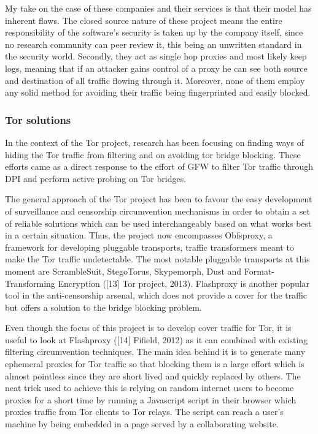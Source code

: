 \documentclass[11pt]{book} %
\begin{document}
My take on the case of these companies and their services is that their model has inherent flaws.  The closed source nature of these project means the entire responsibility of the software’s security is taken up by the company itself, since no research community can peer review it, this being an unwritten standard in the security world. Secondly, they act as single hop proxies and most likely keep logs, meaning that if an attacker gains control of a proxy he can see both source and destination of all traffic flowing through it. Moreover, none of them employ any solid method for avoiding their traffic being fingerprinted and easily blocked.

\subsubsection{Tor solutions}

In the context of the Tor project, research has been focusing on finding ways of hiding the Tor traffic from filtering and on avoiding tor bridge blocking. These efforts came as a direct response to the effort of GFW to filter Tor traffic through DPI and perform active probing on Tor bridges.

The general approach of the Tor project has been to favour the easy development of surveillance and censorship circumvention mechanisms in order to obtain a set of reliable solutions which can be used interchangeably based on what works best in a certain situation. Thus, the project now encompasses Obfsproxy, a framework for developing pluggable transports, traffic transformers meant to make the Tor traffic undetectable. The most notable pluggable transports at this moment are ScrambleSuit, StegoTorus, Skypemorph, Dust and Format-Transforming Encryption ([13] Tor project, 2013). Flashproxy is another popular tool in the anti-censorship arsenal, which does not provide a cover for the traffic but offers a solution to the bridge blocking problem.


Even though the focus of this project is to develop cover traffic for Tor, it is useful to look at Flashproxy ([14] Fifield, 2012) as it can combined with existing filtering circumvention techniques. The main idea behind it is to generate many ephemeral proxies for Tor traffic so that blocking them is a large effort which is almost pointless since they are short lived and quickly replaced by others. The neat trick used to achieve this is relying on random internet users to become proxies for a short time by running a Javascript script in their browser which proxies traffic from Tor clients to Tor relays. The script can reach a user’s machine by being embedded in a page served by a collaborating website. 
\end{document}
